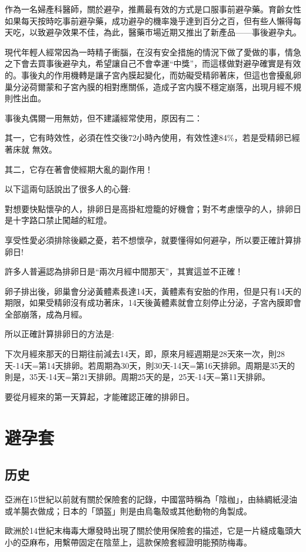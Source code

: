 \documentclass[12pt,UTF8]{ctexbook}
\begin{document}
作為一名婦產科醫師，關於避孕，推薦最有效的方式是口服事前避孕藥。育齡女性如果每天按時吃事前避孕藥，成功避孕的機率幾乎達到百分之百，但有些人懶得每天吃，以致避孕效果不佳，為此，醫藥市場近期又推出了新產品——事後避孕丸。

現代年輕人經常因為一時精子衝腦，在沒有安全措施的情況下做了愛做的事，情急之下會去買事後避孕丸，希望讓自己不會幸運“中獎”，而這樣做對避孕確實是有效的。事後丸的作用機轉是讓子宮內膜起變化，而妨礙受精卵著床，但這也會擾亂卵巢分泌荷爾蒙和子宮內膜的相對應關係，造成子宮内膜不穩定崩落，出現月經不規則性出血。

事後丸偶爾一用無妨，但不建議經常使用，原因有二：

其一，它有時效性，必須在性交後72小時內使用，有效性達84\%，若是受精卵已經著床就
無效。

其二，它存在著會使經期大亂的副作用！

以下這兩句話說出了很多人的心聲:

對想要快點懷孕的人，排卵日是高掛紅燈籠的好機會；對不考慮懷孕的人，排卵日是十字路口禁止闖越的紅燈。

享受性愛必須排除後顧之憂，若不想懷孕，就要懂得如何避孕，所以要正確計算排卵日!

許多人普遍認為排卵日是“兩次月經中間那天”，其實這並不正確！

卵子排出後，卵巢會分泌黃體素長達14天，黃體素有安胎的作用，但是只有14天的期限，如果受精卵沒有成功著床，14天後黃體素就會立刻停止分泌，子宮內膜即會全部崩落，成為月經。

所以正確計算排卵日的方法是:

下次月經來那天的日期往前減去14天，即，原來月經週期是28天來一次，則28天-14天=第14天排卵。若周期為30天，則30天-14天=第16天排卵。周期是35天的則是，35天-14天=第21天排卵。周期25天的是，25天-14天=第11天排卵。

要從月經來的第一天算起，才能確認正確的排卵日。

\section{避孕套}

\subsection{历史}

亞洲在15世紀以前就有關於保險套的記錄，中國當時稱為「陰枷」，由絲綢紙浸油或羊腸衣做成；日本的「頭盔」則是由烏龜殼或其他動物的角製成。

歐洲於14世紀末梅毒大爆發時出現了關於使用保險套的描述，它是一片縫成龜頭大小的亞麻布，用繫帶固定在陰莖上，這款保險套經證明能預防梅毒。
\end{document}
